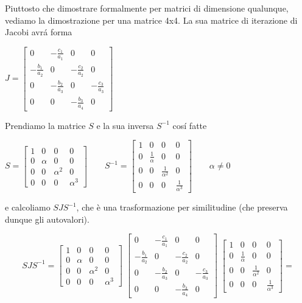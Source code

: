\begin{thproof}
Piuttosto che dimostrare formalmente per matrici di dimensione qualunque, vediamo la dimostrazione per una matrice 4x4. La sua matrice di iterazione di Jacobi avr\'a forma

$J = \left[ \begin{array}{cccc}
0 & - \frac{c_1}{a_1} & 0 & 0 \\ 
- \frac{b_1}{a_2} & 0 & - \frac{c_2}{a_2} & 0 \\ 
0 & - \frac{b_2}{a_3} & 0 & - \frac{c_3}{a_3} \\ 
0 & 0 & - \frac{b_3}{a_4} & 0
\end{array}  \right]$

Prendiamo la matrice $S$ e la sua inversa $S^{-1}$ cos\'i fatte

$S = \left[ \begin{array}{cccc}
1 & 0 & 0 & 0 \\ 
0 & \alpha & 0 & 0 \\ 
0 & 0 & \alpha^2 & 0 \\ 
0 & 0 & 0 & \alpha^3
\end{array}  \right] \qquad S^{-1} = \left[ \begin{array}{cccc}
1 & 0 & 0 & 0 \\ 
0 & \frac{1}{\alpha} & 0 & 0 \\ 
0 & 0 & \frac{1}{\alpha^2} & 0 \\ 
0 & 0 & 0 & \frac{1}{\alpha^3}
\end{array}  \right] \qquad \alpha \neq 0 $

e calcoliamo $ SJS^{-1} $, che \`e una trasformazione per similitudine (che preserva dunque gli autovalori).

\[SJS^{-1} = \left[ \begin{array}{cccc}
1 & 0 & 0 & 0 \\ 
0 & \alpha & 0 & 0 \\ 
0 & 0 & \alpha^2 & 0 \\ 
0 & 0 & 0 & \alpha^3
\end{array}  \right] \; \left[ \begin{array}{cccc}
0 & - \frac{c_1}{a_1} & 0 & 0 \\ 
- \frac{b_1}{a_2} & 0 & - \frac{c_2}{a_2} & 0 \\ 
0 & - \frac{b_2}{a_3} & 0 & - \frac{c_3}{a_3} \\ 
0 & 0 & - \frac{b_3}{a_4} & 0
\end{array}  \right] \; \left[ \begin{array}{cccc}
1 & 0 & 0 & 0 \\ 
0 & \frac{1}{\alpha} & 0 & 0 \\ 
0 & 0 & \frac{1}{\alpha^2} & 0 \\ 
0 & 0 & 0 & \frac{1}{\alpha^3}
\end{array}  \right] = \]


\end{thproof}
